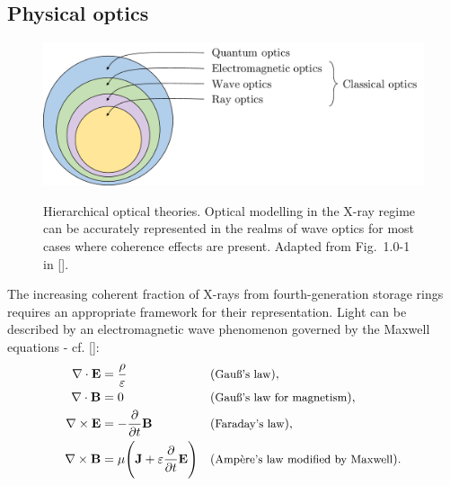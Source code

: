 \begin{refsection}
\section{Physical optics}\label{sec:physical_optics}
\begin{figure}[t]
    \centering
    {\includegraphics[width=.55\linewidth]{figures/ch02/optics.pdf}}
    \caption[Hierarchical optical theories]{Hierarchical optical theories. Optical modelling in the X-ray regime can be accurately represented in the realms of wave optics for most cases where coherence effects are present. Adapted from Fig.~1.0-1 in [\cite{Saleh2019}].}
    \label{fig:optical_theories}
\end{figure}
The increasing coherent fraction of X-rays from fourth-generation storage rings requires
an appropriate framework for their representation. Light can be described by an electromagnetic wave phenomenon governed by the Maxwell equations - cf. [\cite[\textit{§1.1}]{born_wolf1999}]:
\begin{subequations}\label{eq:Maxwell}
    \begin{align}
        \nabla\cdot\textbf{E} &= \frac{\rho}{\varepsilon}
                                       &&(\small{\text{Gau{\ss}'s~law}}),\\
        \nabla\cdot\textbf{B} &= 0 
                                       &&(\small{\text{Gau{\ss}'s law for magnetism}}),\\
        \nabla\times\textbf{E} &= -\frac{\partial}{\partial t}\textbf{B}
                                        &&(\small{\text{Faraday's law}}),\\
        \nabla\times\textbf{B} &= \mu\Bigg(\textbf{J}+\varepsilon\frac{\partial}{\partial t}\textbf{E}\Bigg)
                                       &&(\small{\text{Ampère's law modified by Maxwell}}).
    \end{align}
\end{subequations}{}

\end{refsection}
